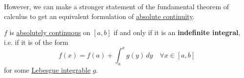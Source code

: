   However, we can make a stronger statement of the fundamental theorem of calculus to get an equivalent formulation of \hyperref[def:absolutely-continuous-function]{absolute continuity}. 

  \begin{theorem}
    \label{thm:fundamental-theorem-of-calculus-of-absolutely}
    $f$ is \hyperref[def:absolutely-continuous-function]{absolutely continuous} on $[a, b]$ if and only if it is an \textbf{indefinite integral}, i.e. if it is of the form 
    \begin{equation}
      f(x) = f(a) + \int_a^x g(y) \,dy \quad \forall x \in [a, b]
    \end{equation}
    for some \hyperref[def:leb-int-signed]{Lebesgue integrable} $g$. 
  \end{theorem}
